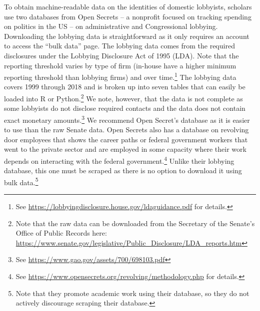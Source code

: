 \documentclass[
      12pt,
        ]{article}
\begin{document}
To obtain machine-readable data on the identities of domestic lobbyists,
scholars use two databases from Open Secrets -- a nonprofit focused on
tracking spending on politics in the US -- on administrative and
Congressional lobbying. Downloading the lobbying data is straightforward
as it only requires an account to access the ``bulk data'' page. The
lobbying data comes from the required disclosures under the Lobbying
Disclosure Act of 1995 (LDA). Note that the reporting threshold varies
by type of firm (in-house have a higher minimum reporting threshold than
lobbying firms) and over time.\footnote{See
  \url{https://lobbyingdisclosure.house.gov/ldaguidance.pdf} for
  details.} The lobbying data covers 1999 through 2018 and is broken up
into seven tables that can easily be loaded into R or Python.\footnote{Note
  that the raw data can be downloaded from the Secretary of the Senate's
  Office of Public Records here:
  \url{https://www.senate.gov/legislative/Public_Disclosure/LDA_reports.htm}}
We note, however, that the data is not complete as some lobbyists do not
disclose required contacts and the data does not contain exact monetary
amounts.\footnote{See \url{https://www.gao.gov/assets/700/698103.pdf}}
We recommend Open Secret's database as it is easier to use than the raw
Senate data. Open Secrets also has a database on revolving door
employees that shows the career paths or federal government workers that
went to the private sector and are employed in some capacity where their
work depends on interacting with the federal government.\footnote{See
  \url{https://www.opensecrets.org/revolving/methodology.php} for
  details.} Unlike their lobbying database, this one must be scraped as
there is no option to download it using bulk data.\footnote{Note that
  they promote academic work using their database, so they do not
  actively discourage scraping their database.}
\end{document}
